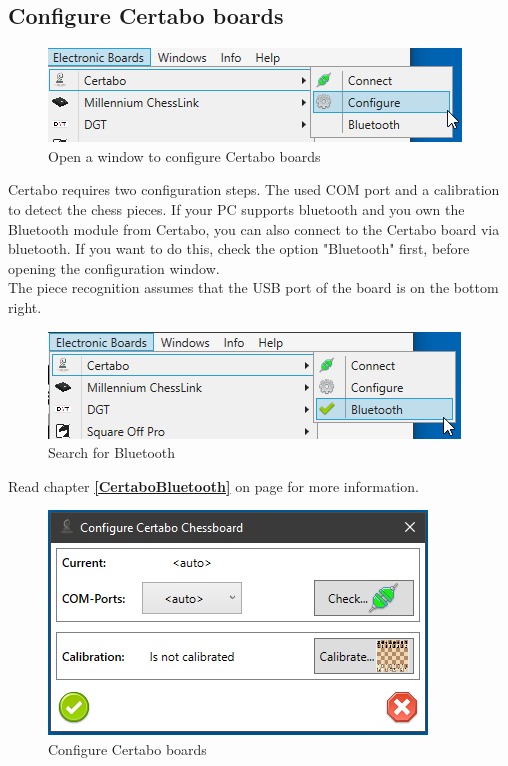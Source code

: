 \documentclass[11pt,a4paper]{article}
\begin{document}
\subsection{Configure Certabo boards} \label{ConfigureCertabo}
\begin{figure}[H]
	\centering
	\includegraphics[scale=1.0]{Certabo1.png}
	\caption{Open a window to configure Certabo boards }
	\label{fig:Certabo1}
\end{figure}

Certabo requires two configuration steps. The used COM port and a calibration to detect the chess pieces. If your PC supports bluetooth and you own the Bluetooth module from Certabo, you can also connect to the Certabo board via bluetooth. If you want to do this, check the option "Bluetooth" first, before opening the configuration window.\\
The piece recognition assumes that the USB port of the board is on the bottom right.

\begin{figure}[H]
	\centering
	\includegraphics[scale=1.0]{Certabo6.png}
	\caption{Search for Bluetooth }
	\label{fig:Certabo6}
\end{figure}

Read chapter \textbf{\ref{CertaboBluetooth}  } on page \pageref{CertaboBluetooth} for more information.

\begin{figure}[H]
	\centering
	\includegraphics[scale=1.0]{Certabo2.png}
	\caption{Configure Certabo boards }
	\label{fig:Certabo2}
\end{figure}
\end{document}
